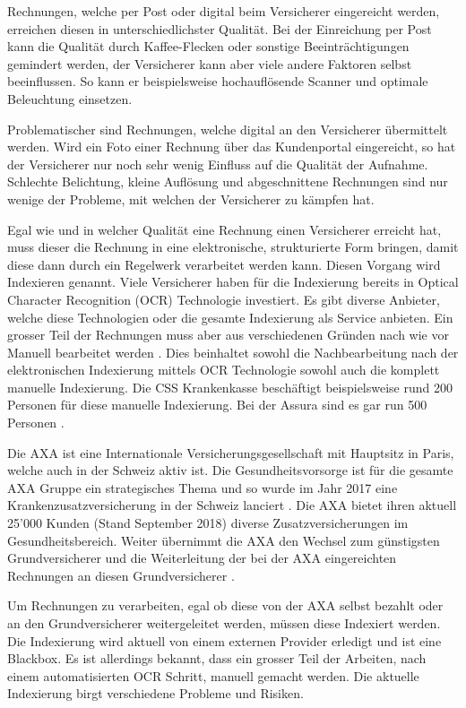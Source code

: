 \documentclass[12pt, twoside, table]{extarticle}
\begin{document}
Rechnungen, welche per Post oder digital beim Versicherer eingereicht werden, erreichen diesen in unterschiedlichster Qualität. Bei der Einreichung per Post kann die Qualität durch Kaffee-Flecken oder sonstige Beeinträchtigungen gemindert werden, der Versicherer kann aber viele andere Faktoren selbst beeinflussen. So kann er beispielsweise hochauflösende Scanner und optimale Beleuchtung einsetzen.

Problematischer sind Rechnungen, welche digital an den Versicherer übermittelt werden. Wird ein Foto einer Rechnung über das Kundenportal eingereicht, so hat der Versicherer nur noch sehr wenig Einfluss auf die Qualität der Aufnahme. Schlechte Belichtung, kleine Auflösung und abgeschnittene Rechnungen sind nur wenige der Probleme, mit welchen der Versicherer zu kämpfen hat.

Egal wie und in welcher Qualität eine Rechnung einen Versicherer erreicht hat, muss dieser die Rechnung in eine elektronische, strukturierte Form bringen, damit diese dann durch ein Regelwerk verarbeitet werden kann. Diesen Vorgang wird Indexieren genannt. Viele Versicherer haben für die Indexierung bereits in Optical Character Recognition (OCR) Technologie investiert. Es gibt diverse Anbieter, welche diese Technologien oder die gesamte Indexierung als Service anbieten. Ein grosser Teil der Rechnungen muss aber aus verschiedenen Gründen nach wie vor Manuell bearbeitet werden . Dies beinhaltet sowohl die Nachbearbeitung nach der elektronischen Indexierung mittels OCR Technologie sowohl auch die komplett manuelle Indexierung. Die CSS Krankenkasse beschäftigt beispielsweise rund 200 Personen für diese manuelle Indexierung. Bei der Assura sind es gar run 500 Personen .

Die AXA ist eine Internationale Versicherungsgesellschaft mit Hauptsitz in Paris, welche auch in der Schweiz aktiv ist. Die Gesundheitsvorsorge ist für die gesamte AXA Gruppe ein strategisches Thema und so wurde im Jahr 2017 eine Krankenzusatzversicherung in der Schweiz lanciert \cite{finanzen.ch2017AxaGewinnen}. Die AXA bietet ihren aktuell 25'000 Kunden (Stand September 2018)  diverse Zusatzversicherungen im Gesundheitsbereich. Weiter übernimmt die AXA den Wechsel zum günstigsten Grundversicherer und die Weiterleitung der bei der AXA eingereichten Rechnungen an diesen Grundversicherer \cite{finanzen.ch2017AxaGewinnen}.

Um Rechnungen zu verarbeiten, egal ob diese von der AXA selbst bezahlt oder an den Grundversicherer weitergeleitet werden, müssen diese Indexiert werden. Die Indexierung wird aktuell von einem externen Provider erledigt und ist eine Blackbox. Es ist allerdings bekannt, dass ein grosser Teil der Arbeiten, nach einem automatisierten OCR Schritt, manuell gemacht werden. Die aktuelle Indexierung birgt verschiedene Probleme und Risiken. 
\end{document}

